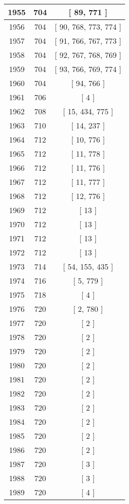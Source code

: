 \begin{center}
\begin{longtable}[H]{|| c c c ||}
\hline
1955 & 704 & [ 89, 771 ] \\ 
\hline
1956 & 704 & [ 90, 768, 773, 774 ] \\ 
\hline
1957 & 704 & [ 91, 766, 767, 773 ] \\ 
\hline
1958 & 704 & [ 92, 767, 768, 769 ] \\ 
\hline
1959 & 704 & [ 93, 766, 769, 774 ] \\ 
\hline
1960 & 704 & [ 94, 766 ] \\ 
\hline
1961 & 706 & [ 4 ] \\ 
\hline
1962 & 708 & [ 15, 434, 775 ] \\ 
\hline
1963 & 710 & [ 14, 237 ] \\ 
\hline
1964 & 712 & [ 10, 776 ] \\ 
\hline
1965 & 712 & [ 11, 778 ] \\ 
\hline
1966 & 712 & [ 11, 776 ] \\ 
\hline
1967 & 712 & [ 11, 777 ] \\ 
\hline
1968 & 712 & [ 12, 776 ] \\ 
\hline
1969 & 712 & [ 13 ] \\ 
\hline
1970 & 712 & [ 13 ] \\ 
\hline
1971 & 712 & [ 13 ] \\ 
\hline
1972 & 712 & [ 13 ] \\ 
\hline
1973 & 714 & [ 54, 155, 435 ] \\ 
\hline
1974 & 716 & [ 5, 779 ] \\ 
\hline
1975 & 718 & [ 4 ] \\ 
\hline
1976 & 720 & [ 2, 780 ] \\ 
\hline
1977 & 720 & [ 2 ] \\ 
\hline
1978 & 720 & [ 2 ] \\ 
\hline
1979 & 720 & [ 2 ] \\ 
\hline
1980 & 720 & [ 2 ] \\ 
\hline
1981 & 720 & [ 2 ] \\ 
\hline
1982 & 720 & [ 2 ] \\ 
\hline
1983 & 720 & [ 2 ] \\ 
\hline
1984 & 720 & [ 2 ] \\ 
\hline
1985 & 720 & [ 2 ] \\ 
\hline
1986 & 720 & [ 2 ] \\ 
\hline
1987 & 720 & [ 3 ] \\ 
\hline
1988 & 720 & [ 3 ] \\ 
\hline
1989 & 720 & [ 4 ] \\ 
\hline

\end{longtable}
\end{center}

